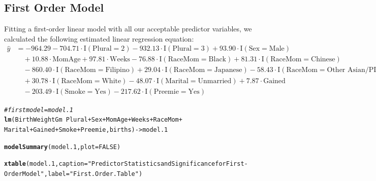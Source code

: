\documentclass{article}\usepackage[]{graphicx}\usepackage[]{xcolor}
\makeatletter
\newcommand{\hlnum}[1]{\textcolor[rgb]{0.686,0.059,0.569}{#1}}%
\newcommand{\hlstr}[1]{\textcolor[rgb]{0.192,0.494,0.8}{#1}}%
\newcommand{\hlcom}[1]{\textcolor[rgb]{0.678,0.584,0.686}{\textit{#1}}}%
\newcommand{\hlopt}[1]{\textcolor[rgb]{0,0,0}{#1}}%
\newcommand{\hlstd}[1]{\textcolor[rgb]{0.345,0.345,0.345}{#1}}%
\newcommand{\hlkwb}[1]{\textcolor[rgb]{0.69,0.353,0.396}{#1}}%
\newcommand{\hlkwc}[1]{\textcolor[rgb]{0.333,0.667,0.333}{#1}}%
\newcommand{\hlkwd}[1]{\textcolor[rgb]{0.737,0.353,0.396}{\textbf{#1}}}%
\newenvironment{kframe}{%
 \def\at@end@of@kframe{}%
 \ifinner\ifhmode%
  \def\at@end@of@kframe{\end{minipage}}%
  \begin{minipage}{\columnwidth}%
 \fi\fi%
 \def\FrameCommand##1{\hskip\@totalleftmargin \hskip-\fboxsep
 \colorbox{shadecolor}{##1}\hskip-\fboxsep
     \hskip-\linewidth \hskip-\@totalleftmargin \hskip\columnwidth}%
 \MakeFramed {\advance\hsize-\width
   \@totalleftmargin\z@ \linewidth\hsize
   \@setminipage}}%
 {\par\unskip\endMakeFramed%
 \at@end@of@kframe}
\newenvironment{knitrout}{}{} %
\makeatother
\begin{document}
\subsection{First Order Model}

Fitting a first-order linear model with all our acceptable predictor variables, we calculated the following estimated linear regression equation: \\

\begin{align*} \hat{y} &= -964.29 - 704.71\cdot \text{I}(\text{Plural} = 2) - 932.13\cdot \text{I}(\text{Plural} = 3) + 93.90\cdot \text{I}(\text{Sex} = \text{Male}) \\ &\quad + 10.88\cdot \text{MomAge} + 97.81\cdot \text{Weeks} -76.88\cdot \text{I}(\text{RaceMom} = \text{Black}) + 81.31\cdot \text{I}(\text{RaceMom} = \text{Chinese}) \\ &\quad -860.40\cdot \text{I}(\text{RaceMom} = \text{Filipino}) + 29.04\cdot \text{I}(\text{RaceMom} = \text{Japanese}) -58.43\cdot \text{I}(\text{RaceMom} = \text{Other\ Asian/PI}) \\ &\quad + 30.78\cdot \text{I}(\text{RaceMom} = \text{White}) -48.07\cdot \text{I}(\text{Marital} = \text{Unmarried}) + 7.87\cdot \text{Gained} \\ &\quad -203.49\cdot \text{I}(\text{Smoke} = \text{Yes}) -217.62\cdot \text{I}(\text{Preemie} = \text{Yes}) \end{align*}
  
  
\begin{knitrout}
\color{fgcolor}\begin{kframe}
\begin{alltt}
\hlcom{#first model = model.1}
\hlkwd{lm}\hlstd{(BirthWeightGm} \hlopt{~} \hlstd{Plural} \hlopt{+} \hlstd{Sex} \hlopt{+} \hlstd{MomAge} \hlopt{+} \hlstd{Weeks} \hlopt{+} \hlstd{RaceMom} \hlopt{+}
     \hlstd{Marital} \hlopt{+} \hlstd{Gained} \hlopt{+} \hlstd{Smoke} \hlopt{+} \hlstd{Preemie, births)} \hlkwb{->} \hlstd{model.1}

\hlkwd{modelSummary}\hlstd{(model.1,} \hlkwc{plot}\hlstd{=}\hlnum{FALSE}\hlstd{)}
\end{alltt}
\end{kframe}
\end{knitrout}
  
\begin{kframe}
\begin{alltt}
\hlkwd{xtable}\hlstd{(model.1,} \hlkwc{caption}\hlstd{=}\hlstr{"Predictor Statistics and Significance for First-Order Model"}\hlstd{,} \hlkwc{label}\hlstd{=}\hlstr{"First.Order.Table"}\hlstd{)}
\end{alltt}
\end{kframe}
\end{document}
